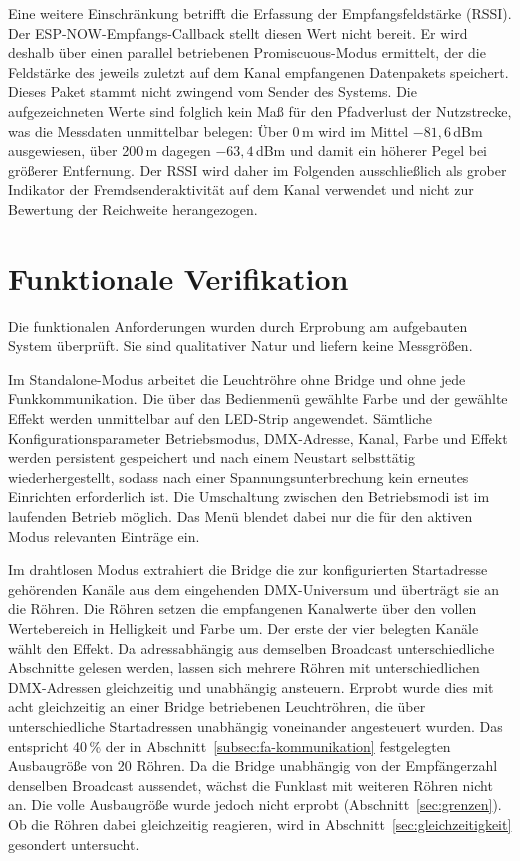 Eine weitere Einschränkung betrifft die Erfassung der Empfangsfeldstärke (RSSI). Der
ESP-NOW-Empfangs-Callback stellt diesen Wert nicht bereit. Er wird deshalb über
einen parallel betriebenen Promiscuous-Modus ermittelt, der die Feldstärke des
jeweils zuletzt auf dem Kanal empfangenen Datenpakets speichert. Dieses Paket
stammt nicht zwingend vom Sender des Systems. Die aufgezeichneten Werte sind
folglich kein Maß für den Pfadverlust der Nutzstrecke, was die Messdaten
unmittelbar belegen: Über 0\,m wird im Mittel $-81{,}6$\,dBm ausgewiesen, über
200\,m dagegen $-63{,}4$\,dBm und damit ein höherer Pegel bei größerer
Entfernung. Der RSSI wird daher im Folgenden ausschließlich als grober Indikator
der Fremdsenderaktivität auf dem Kanal verwendet und nicht zur Bewertung der
Reichweite herangezogen.

\section{Funktionale Verifikation}
\label{sec:funktionale-tests}

Die funktionalen Anforderungen wurden durch Erprobung am aufgebauten System
überprüft. Sie sind qualitativer Natur und liefern keine Messgrößen.

Im Standalone-Modus arbeitet die Leuchtröhre ohne Bridge und ohne jede
Funkkommunikation. Die über das Bedienmenü gewählte Farbe und der gewählte Effekt
werden unmittelbar auf den LED-Strip angewendet. Sämtliche Konfigurationsparameter
Betriebsmodus, DMX-Adresse, Kanal, Farbe und Effekt werden persistent
gespeichert und nach einem Neustart selbsttätig wiederhergestellt, sodass nach
einer Spannungsunterbrechung kein erneutes Einrichten erforderlich ist. Die
Umschaltung zwischen den Betriebsmodi ist im laufenden Betrieb möglich. Das Menü
blendet dabei nur die für den aktiven Modus relevanten Einträge ein.

Im drahtlosen Modus extrahiert die Bridge die zur konfigurierten Startadresse
gehörenden Kanäle aus dem eingehenden DMX-Universum und überträgt sie an die
Röhren. Die Röhren setzen die empfangenen Kanalwerte über den vollen Wertebereich
in Helligkeit und Farbe um. Der erste der vier belegten Kanäle wählt den Effekt.
Da adressabhängig aus demselben Broadcast unterschiedliche Abschnitte gelesen
werden, lassen sich mehrere Röhren mit unterschiedlichen DMX-Adressen gleichzeitig
und unabhängig ansteuern. Erprobt wurde dies mit acht gleichzeitig an einer
Bridge betriebenen Leuchtröhren, die über unterschiedliche Startadressen
unabhängig voneinander angesteuert wurden. Das entspricht 40\,\% der in
Abschnitt~\ref{subsec:fa-kommunikation} festgelegten Ausbaugröße von 20 Röhren.
Da die Bridge unabhängig von der Empfängerzahl denselben Broadcast aussendet,
wächst die Funklast mit weiteren Röhren nicht an. Die volle Ausbaugröße wurde
jedoch nicht erprobt (Abschnitt~\ref{sec:grenzen}). Ob die Röhren dabei
gleichzeitig reagieren, wird in Abschnitt~\ref{sec:gleichzeitigkeit} gesondert
untersucht.

